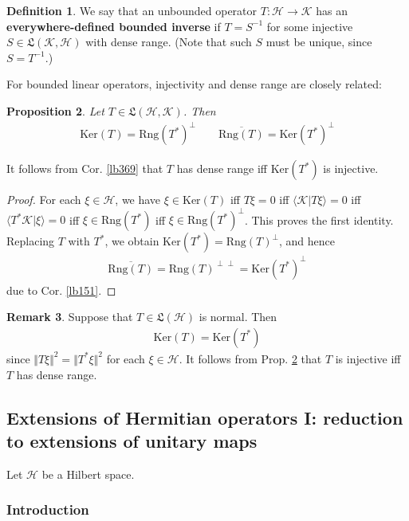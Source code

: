 \documentclass[12pt,b5paper,notitlepage]{article}
\theoremstyle{definition}
\newtheorem{df}{Definition}[subsection]
\newtheorem{rem}[df]{Remark}
\theoremstyle{plain}
\newtheorem{pp}[df]{Proposition}
\newcommand{\fk}{\mathfrak}
\newcommand{\ovl}{\overline}
\newcommand{\bk}[1]{\langle {#1}\rangle}
\newcommand{\Ker}{\mathrm{Ker}}
\newcommand{\Rng}{\mathrm{Rng}}
\newcommand{\MH}{\mathcal H}
\newcommand{\MK}{\mathcal K}
\numberwithin{equation}{section}
\begin{document}
\begin{df}
We say that an unbounded operator $T:\MH\rightarrow\MK$ has an \textbf{everywhere-defined bounded inverse}  if $T=S^{-1}$ for some injective $S\in\fk L(\MK,\MH)$ with dense range. (Note that such $S$ must be unique, since $S=T^{-1}$.)
\end{df}

For bounded linear operators, injectivity and dense range are closely related:



\begin{pp}\label{lb370}
Let $T\in\fk L(\MH,\MK)$. Then
\begin{align*}
\Ker(T)=\Rng(T^*)^\perp\qquad \ovl{\Rng(T)}=\Ker(T^*)^\perp
\end{align*}
\end{pp}

It follows from Cor. \ref{lb369} that $T$ has dense range iff $\Ker(T^*)$ is injective.


\begin{proof}
For each $\xi\in\MH$, we have $\xi\in\Ker(T)$ iff $T\xi=0$ iff $\bk{\MK|T\xi}=0$ iff $\bk{T^*\MK|\xi}=0$ iff $\xi\in\Rng(T^*)$ iff $\xi\in\Rng(T^*)^\perp$. This proves the first identity. Replacing $T$ with $T^*$, we obtain $\Ker(T^*)=\Rng(T)^\perp$, and hence
\begin{align*}
\ovl{\Rng(T)}=\Rng(T)^{\perp\perp}=\Ker(T^*)^\perp
\end{align*}
due to Cor. \ref{lb151}.
\end{proof}


\begin{rem}\label{lb381}
Suppose that $T\in\fk L(\MH)$ is normal. Then 
\begin{align*}
\Ker(T)=\Ker(T^*)
\end{align*}
since $\Vert T\xi\Vert^2=\Vert T^*\xi\Vert^2$ for each $\xi\in\MH$. It follows from Prop. \ref{lb370} that $T$ is injective iff $T$ has dense range.
\end{rem}




\subsection{Extensions of Hermitian operators I: reduction to extensions of unitary maps}\label{lb382}

Let $\MH$ be a Hilbert space.


\subsubsection{Introduction}\label{lb395}
\end{document}
